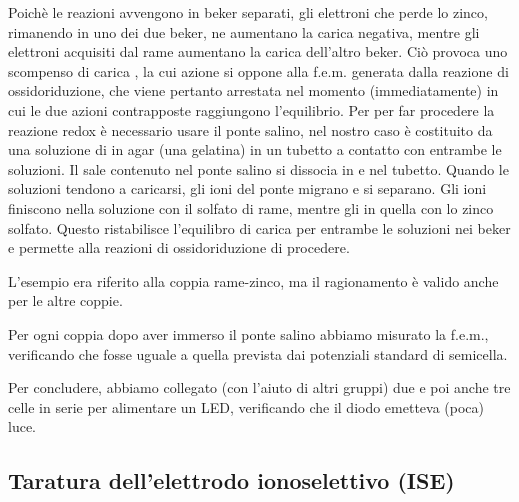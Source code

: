 Poichè le reazioni avvengono in beker separati, gli elettroni che perde lo zinco, rimanendo in uno dei due beker, ne aumentano la carica negativa, mentre gli elettroni acquisiti dal rame aumentano la carica dell'altro beker.
Ciò provoca uno scompenso di carica
, la cui azione si oppone alla f.e.m. generata dalla reazione di ossidoriduzione, che viene pertanto arrestata nel momento (immediatamente) in cui le due azioni contrapposte raggiungono l'equilibrio.
Per per far procedere la reazione redox è necessario usare il ponte salino, nel nostro caso è costituito da una soluzione di  in agar (una gelatina) in un tubetto a contatto con entrambe le soluzioni.
Il sale contenuto nel ponte salino si dissocia in  e  nel tubetto.
Quando le soluzioni tendono a caricarsi, gli ioni del ponte migrano e si separano.
Gli ioni  finiscono nella soluzione con il solfato di rame, mentre gli  in quella con lo zinco solfato.
Questo ristabilisce l'equilibro di carica per entrambe le soluzioni nei beker e permette alla reazioni di ossidoriduzione di procedere.

L'esempio era riferito alla coppia rame-zinco, ma il ragionamento è valido anche per le altre coppie.

Per ogni coppia dopo aver immerso il ponte salino abbiamo misurato la f.e.m., verificando che fosse uguale a quella prevista dai potenziali standard di semicella.

Per concludere, abbiamo collegato (con l'aiuto di altri gruppi) due e poi anche tre celle in serie per alimentare un LED, verificando che il diodo emetteva (poca) luce.

\subsection*{Taratura dell'elettrodo ionoselettivo (ISE)}

